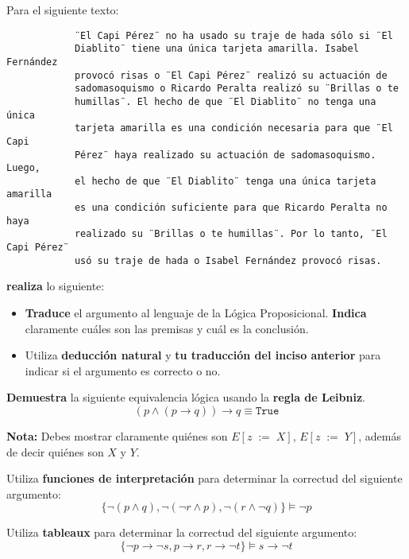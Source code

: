 \documentclass[oneside]{style}
\begin{document}
\begin{questions}[label=\protect\circled{\bfseries\arabic*}]

    \question
    {
        Para el siguiente texto:
        \begin{verbatim}
            ¨El Capi Pérez¨ no ha usado su traje de hada sólo si ¨El 
            Diablito¨ tiene una única tarjeta amarilla. Isabel Fernández 
            provocó risas o ¨El Capi Pérez¨ realizó su actuación de 
            sadomasoquismo o Ricardo Peralta realizó su ¨Brillas o te 
            humillas¨. El hecho de que ¨El Diablito¨ no tenga una única 
            tarjeta amarilla es una condición necesaria para que ¨El Capi 
            Pérez¨ haya realizado su actuación de sadomasoquismo. Luego, 
            el hecho de que ¨El Diablito¨ tenga una única tarjeta amarilla 
            es una condición suficiente para que Ricardo Peralta no haya 
            realizado su ¨Brillas o te humillas¨. Por lo tanto, ¨El Capi Pérez¨
            usó su traje de hada o Isabel Fernández provocó risas. 
        \end{verbatim}

        \textbf{realiza} lo siguiente:
        \begin{itemize}
            \item \textbf{Traduce} el argumento al lenguaje de la Lógica 
            Proposicional. \textbf{Indica} claramente cuáles son las premisas 
            y cuál es la conclusión. 
            
            \item Utiliza \textbf{deducción natural} y \textbf{tu 
            traducción del inciso anterior} para indicar si el argumento es 
            correcto o no. 
        \end{itemize}
    }  

    \question
    {
        \textbf{Demuestra} la siguiente equivalencia lógica usando la 
        \textbf{regla de Leibniz}.
        \begin{equation*}
            (p \land (p \rightarrow q)) \rightarrow q \equiv 
            \texttt{True}
        \end{equation*}

        \textbf{Nota:} Debes mostrar claramente quiénes son $E[z \; := \; X]$, 
        $E[z \; := \; Y]$, además de decir quiénes son $X$ y $Y$. 
    }

    \question
    {
        Utiliza \textbf{funciones de interpretación} para determinar la 
        correctud del siguiente argumento:
        \begin{equation*}
            \{\neg (p \land q), \neg (\neg r \land p), \neg (r \land \neg q)\} 
            \models \neg p
        \end{equation*}
    } 

    \question
    {
        Utiliza \textbf{tableaux} para determinar la correctud del siguiente 
        argumento:
        \begin{equation*}
            \{\neg p \rightarrow \neg s, p \rightarrow r, r \rightarrow \neg t\}
            \models s \rightarrow \neg t 
        \end{equation*}
    } 
\end{questions}
\end{document}
